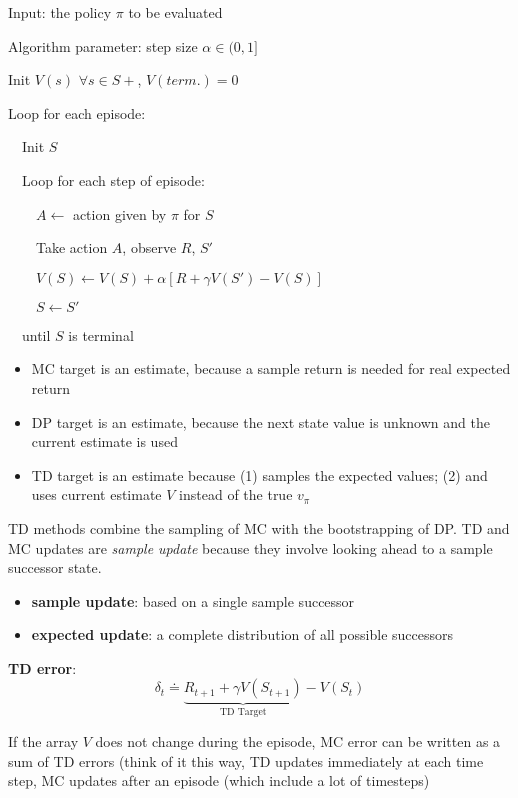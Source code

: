 \documentclass[sutton_barto_notes.tex]{subfiles}
\begin{document}
\begin{tcolorbox}[width=1.1\textwidth,title={Tabular TD(0) for estimating $v_\pi$}]
Input: the policy $\pi$ to be evaluated

Algorithm parameter: step size $\alpha \in (0, 1]$

Init $V(s)$ $\forall s \in S+$, $V(term.) = 0$

Loop for each episode:

$\quad$Init $S$

$\quad$Loop for each step of episode:

$\quad\quad A \leftarrow$ action given by $\pi$ for $S$

$\quad\quad$Take action $A$, observe $R$, $S'$

$\quad\quad V(S) \leftarrow V(S) + \alpha[R + \gamma V(S') - V(S)]$

$\quad\quad S \leftarrow S'$

$\quad$until $S$ is terminal
\end{tcolorbox}

\begin{itemize}
\item MC target is an estimate, because a sample return is needed for real expected return
\item DP target is an estimate, because the next state value is unknown and the current estimate is used
\item TD target is an estimate because (1) samples the expected values; (2) and uses current estimate $V$ instead of the true $v_\pi$
\end{itemize}

TD methods combine the sampling of MC with the bootstrapping of DP.
TD and MC updates are \textit{sample update} because they involve looking ahead to a sample successor state.

\begin{itemize}
\item \textbf{sample update}: based on a single sample successor
\item \textbf{expected update}: a complete distribution of all possible successors
\end{itemize}

\begin{definition}
\textbf{TD error}:
$$\delta_t \doteq \underbrace{R_{t+1} + \gamma V(S_{t+1})}_\text{TD Target} - V(S_t)$$
\end{definition}

If the array $V$ does not change during the episode, MC error can be written as a sum of TD errors (think of it this way, TD updates immediately at each time step, MC updates after an episode (which include a lot of timesteps)
\end{document}
